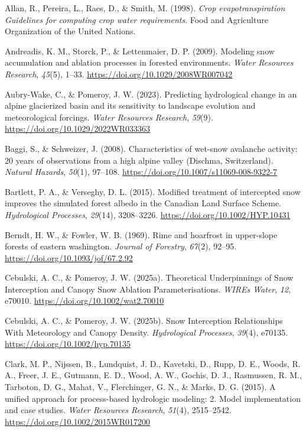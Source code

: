 \documentclass[
]{agujournal2019}
\newlength{\cslhangindent}
\newenvironment{CSLReferences}[2] %
 {\begin{list}{}{%
  \setlength{\itemindent}{0pt}
  \setlength{\leftmargin}{0pt}
  \setlength{\parsep}{0pt}
  \ifodd #1
   \setlength{\leftmargin}{\cslhangindent}
   \setlength{\itemindent}{-1\cslhangindent}
  \fi
  \setlength{\itemsep}{#2\baselineskip}}}
 {\end{list}}
\begin{document}
\label{refs}
\begin{CSLReferences}{1}{0}
Allan, R., Pereira, L., Raes, D., \& Smith, M. (1998). \emph{Crop
evapotranspiration {Guidelines} for computing crop water requirements}.
{Food and Agriculture Organization of the United Nations}.

Andreadis, K. M., Storck, P., \& Lettenmaier, D. P. (2009). Modeling
snow accumulation and ablation processes in forested environments.
\emph{Water Resources Research}, \emph{45}(5), 1--33.
\url{https://doi.org/10.1029/2008WR007042}

Aubry-Wake, C., \& Pomeroy, J. W. (2023). Predicting hydrological change
in an alpine glacierized basin and its sensitivity to landscape
evolution and meteorological forcings. \emph{Water Resources Research},
\emph{59}(9). \url{https://doi.org/10.1029/2022WR033363}

Baggi, S., \& Schweizer, J. (2008). Characteristics of wet-snow
avalanche activity: 20 years of observations from a high alpine valley
({Dischma}, {Switzerland}). \emph{Natural Hazards}, \emph{50}(1),
97--108. \url{https://doi.org/10.1007/s11069-008-9322-7}

Bartlett, P. A., \& Verseghy, D. L. (2015). Modified treatment of
intercepted snow improves the simulated forest albedo in the {Canadian
Land Surface Scheme}. \emph{Hydrological Processes}, \emph{29}(14),
3208--3226. \url{https://doi.org/10.1002/HYP.10431}

Berndt, H. W., \& Fowler, W. B. (1969). Rime and hoarfrost in
upper-slope forests of eastern washington. \emph{Journal of Forestry},
\emph{67}(2), 92--95. \url{https://doi.org/10.1093/jof/67.2.92}

Cebulski, A. C., \& Pomeroy, J. W. (2025a). Theoretical {Underpinnings}
of {Snow Interception} and {Canopy Snow Ablation Parameterisations}.
\emph{WIREs Water}, \emph{12}, e70010.
\url{https://doi.org/10.1002/wat2.70010}

Cebulski, A. C., \& Pomeroy, J. W. (2025b). Snow {Interception
Relationships With Meteorology} and {Canopy Density}. \emph{Hydrological
Processes}, \emph{39}(4), e70135.
\url{https://doi.org/10.1002/hyp.70135}

Clark, M. P., Nijssen, B., Lundquist, J. D., Kavetski, D., Rupp, D. E.,
Woods, R. A., Freer, J. E., Gutmann, E. D., Wood, A. W., Gochis, D. J.,
Rasmussen, R. M., Tarboton, D. G., Mahat, V., Flerchinger, G. N., \&
Marks, D. G. (2015). A unified approach for process-based hydrologic
modeling: 2. {Model} implementation and case studies. \emph{Water
Resources Research}, \emph{51}(4), 2515--2542.
\url{https://doi.org/10.1002/2015WR017200}


\end{CSLReferences}
\end{document}
